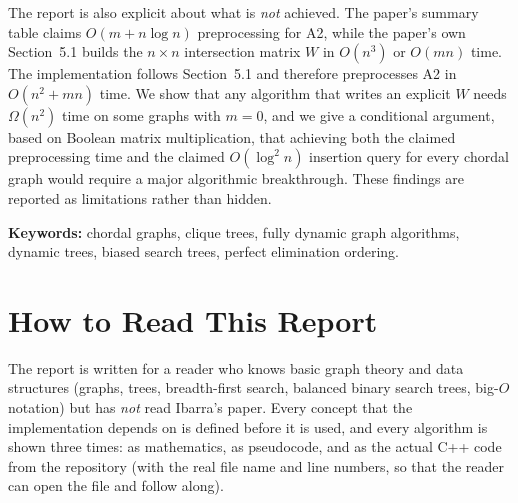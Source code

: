 \documentclass[11pt,a4paper,oneside]{report}
\theoremstyle{plain}
\theoremstyle{definition}
\theoremstyle{remark}
\begin{document}
The report is also explicit about what is \emph{not} achieved. The paper's summary table claims
\(O(m+n\log n)\) preprocessing for A2, while the paper's own Section~5.1 builds the
\(n\times n\) intersection matrix \(W\) in \(O(n^3)\) or \(O(mn)\) time. The implementation
follows Section~5.1 and therefore preprocesses A2 in \(O(n^2+mn)\) time. We show that any
algorithm that writes an explicit \(W\) needs \(\Omega(n^2)\) time on some graphs with \(m=0\),
and we give a conditional argument, based on Boolean matrix multiplication, that achieving both
the claimed preprocessing time and the claimed \(O(\log^2 n)\) insertion query for every chordal
graph would require a major algorithmic breakthrough. These findings are reported as limitations
rather than hidden.

\vspace{3mm}
\noindent\textbf{Keywords:} chordal graphs, clique trees, fully dynamic graph algorithms,
dynamic trees, biased search trees, perfect elimination ordering.

\cleardoublepage
{}
{}
\tableofcontents
\cleardoublepage
{}
{}
\listoffigures
\cleardoublepage
{}
{}
\listoftables
\cleardoublepage
{}
{}
\listofalgorithms

\chapter*{How to Read This Report}
\thispagestyle{plain}

The report is written for a reader who knows basic graph theory and data structures (graphs,
trees, breadth-first search, balanced binary search trees, big-\(O\) notation) but has
\emph{not} read Ibarra's paper. Every concept that the implementation depends on is defined
before it is used, and every algorithm is shown three times: as mathematics, as pseudocode, and
as the actual C++ code from the repository (with the real file name and line numbers, so that
the reader can open the file and follow along).
\end{document}
